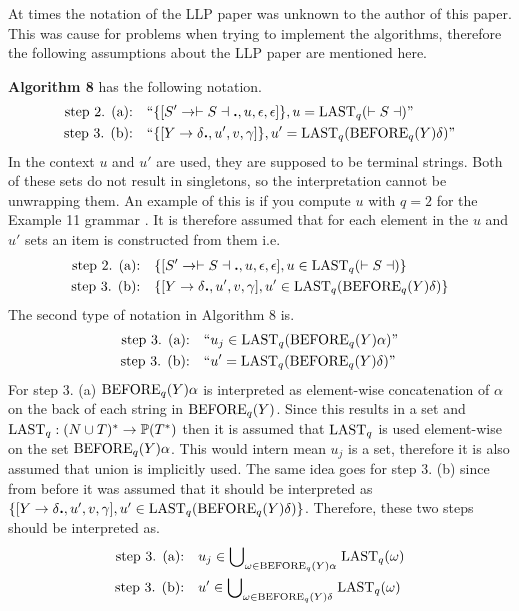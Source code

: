 At times the notation of the LLP paper \cite{Vagner2007} was unknown to the author of this paper. This was cause for problems when trying to implement the algorithms, therefore the following assumptions about the LLP paper \cite{Vagner2007} are mentioned here.

\textbf{Algorithm 8} \cite[13]{Vagner2007} has the following notation.
\begin{align*}
    \text{step 2. (a):}& \quad \text{``}\{[S' \to \vdash S \dashv \textbf{.}, u, \epsilon, \epsilon]\}, u = \text{LAST}_q(\vdash S \dashv)\text{''} \\
    \text{step 3. (b):}& \quad \text{``}\{[Y \to \delta \textbf{.}, u', v, \gamma]\}, u' = \text{LAST}_q(\text{BEFORE}_q(Y)\delta)\text{''}
\end{align*}    
In the context $u$ and $u'$ are used, they are supposed to be terminal strings. Both of these sets do not result in singletons, so the interpretation cannot be unwrapping them. An example of this is if you compute $u$ with $q=2$ for the Example 11 grammar \cite[14]{Vagner2007}. It is therefore assumed that for each element in the $u$ and $u'$ sets an item is constructed from them i.e.
\begin{align*}
    \text{step 2. (a):}& \quad \{[S' \to \vdash S \dashv \textbf{.}, u, \epsilon, \epsilon], u \in \text{LAST}_q(\vdash S \dashv)\} \\
    \text{step 3. (b):}& \quad \{[Y \to \delta \textbf{.}, u', v, \gamma], u' \in \text{LAST}_q(\text{BEFORE}_q(Y)\delta)\}
\end{align*}
The second type of notation in Algorithm 8 is.
\begin{align*}
    \text{step 3. (a):}& \quad \text{``} u_j \in \text{LAST}_q(\text{BEFORE}_q(Y) \alpha)\text{''} \\
    \text{step 3. (b):}& \quad \text{``} u' = \text{LAST}_q(\text{BEFORE}_q(Y)\delta)\text{''}
\end{align*}    
For step 3. (a) $\text{BEFORE}_q(Y) \alpha$ is interpreted as element-wise concatenation of $\alpha$ on the back of each string in $\text{BEFORE}_q(Y)$. Since this results in a set and $\text{LAST}_q: (N \cup T)^* \to \mathbb{P}(T^*)$ then it is assumed that $\text{LAST}_q$ is used element-wise on the set $\text{BEFORE}_q(Y) \alpha$. This would intern mean $u_j$ is a set, therefore it is also assumed that union is implicitly used. The same idea goes for step 3. (b) since from before it was assumed that it should be interpreted as $\{[Y \to \delta \textbf{.}, u', v, \gamma], u' \in \text{LAST}_q(\text{BEFORE}_q(Y)\delta)\}$. Therefore, these two steps should be interpreted as.
\begin{align*}
    \text{step 3. (a):}& \quad u_j \in \text{$\bigcup$}_{\omega \in \text{BEFORE}_q(Y) \alpha} \; \text{LAST}_q(\omega) \\
    \text{step 3. (b):}& \quad  u' \in \text{$\bigcup$}_{\omega \in \text{BEFORE}_q(Y) \delta} \; \text{LAST}_q(\omega)
\end{align*}
